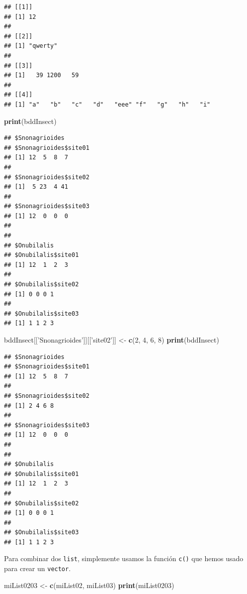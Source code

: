 \documentclass[]{book}
\newenvironment{Shaded}{\begin{snugshade}}{\end{snugshade}}
\newcommand{\KeywordTok}[1]{\textcolor[rgb]{0.13,0.29,0.53}{\textbf{#1}}}
\newcommand{\DecValTok}[1]{\textcolor[rgb]{0.00,0.00,0.81}{#1}}
\newcommand{\StringTok}[1]{\textcolor[rgb]{0.31,0.60,0.02}{#1}}
\newcommand{\NormalTok}[1]{#1}
\begin{document}
\begin{verbatim}
## [[1]]
## [1] 12
## 
## [[2]]
## [1] "qwerty"
## 
## [[3]]
## [1]   39 1200   59
## 
## [[4]]
## [1] "a"   "b"   "c"   "d"   "eee" "f"   "g"   "h"   "i"
\end{verbatim}

\begin{Shaded}
\begin{Highlighting}[]
\KeywordTok{print}\NormalTok{(bddInsect)}
\end{Highlighting}
\end{Shaded}

\begin{verbatim}
## $Snonagrioides
## $Snonagrioides$site01
## [1] 12  5  8  7
## 
## $Snonagrioides$site02
## [1]  5 23  4 41
## 
## $Snonagrioides$site03
## [1] 12  0  0  0
## 
## 
## $Onubilalis
## $Onubilalis$site01
## [1] 12  1  2  3
## 
## $Onubilalis$site02
## [1] 0 0 0 1
## 
## $Onubilalis$site03
## [1] 1 1 2 3
\end{verbatim}

\begin{Shaded}
\begin{Highlighting}[]
\NormalTok{bddInsect[[}\StringTok{'Snonagrioides'}\NormalTok{]][[}\StringTok{'site02'}\NormalTok{]] <-}\StringTok{ }\KeywordTok{c}\NormalTok{(}\DecValTok{2}\NormalTok{, }\DecValTok{4}\NormalTok{, }\DecValTok{6}\NormalTok{, }\DecValTok{8}\NormalTok{)}
\KeywordTok{print}\NormalTok{(bddInsect)}
\end{Highlighting}
\end{Shaded}

\begin{verbatim}
## $Snonagrioides
## $Snonagrioides$site01
## [1] 12  5  8  7
## 
## $Snonagrioides$site02
## [1] 2 4 6 8
## 
## $Snonagrioides$site03
## [1] 12  0  0  0
## 
## 
## $Onubilalis
## $Onubilalis$site01
## [1] 12  1  2  3
## 
## $Onubilalis$site02
## [1] 0 0 0 1
## 
## $Onubilalis$site03
## [1] 1 1 2 3
\end{verbatim}

Para combinar dos \texttt{list}, simplemente usamos la función
\texttt{c()} que hemos usado para crear un \texttt{vector}.

\begin{Shaded}
\begin{Highlighting}[]
\NormalTok{miList0203 <-}\StringTok{ }\KeywordTok{c}\NormalTok{(miList02, miList03)}
\KeywordTok{print}\NormalTok{(miList0203)}
\end{Highlighting}
\end{Shaded}
\end{document}
